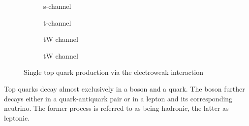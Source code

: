 \begin{figure}[H]
    \centering
    \begin{subfigure}[t]{0.2\textwidth}
        \centering
        
        \caption{s-channel}
        \label{fig:top_single_s}
    \end{subfigure}\hfill
    \begin{subfigure}[t]{0.2\textwidth}
        \centering
        
        \caption{t-channel}
        \label{fig:top_single_t}
    \end{subfigure}\hfill
    \begin{subfigure}[t]{0.2\textwidth}
        \centering
        
        \caption{tW channel}
        \label{fig:top_single_tw_1}
    \end{subfigure}\hfill
    \begin{subfigure}[t]{0.2\textwidth}
        \centering
        
        \caption{tW channel}
        \label{fig:top_single_tw_2}
    \end{subfigure}
    \caption{Single top quark production via the electroweak interaction}
    \label{fig:top_single}
\end{figure}
Top quarks decay almost exclusively in a \PWplus boson and a \Pbottom quark. The boson further decays either in a quark-antiquark pair or in a lepton and its corresponding neutrino. The former process is referred to as being hadronic, the latter as leptonic.
